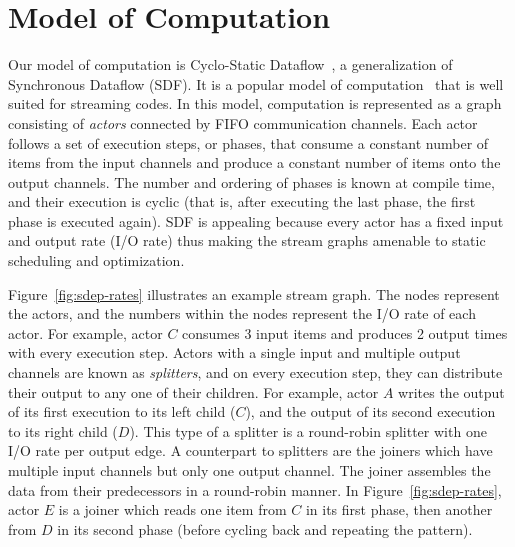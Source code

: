 \newcommand{\la}{$\leftarrow$}
\newcommand{\IND}{\begin{ALC@g}}
\newcommand{\UND}{\end{ALC@g}}
\newcommand{\tup}[2]{\langle{#1}, {#2}\rangle}

\section{Model of Computation}
\label{sec:modelofcomp}


Our model of computation is Cyclo-Static Dataflow~\cite{BELP96},
a generalization of Synchronous Dataflow (SDF). It  is a popular  model of
computation~\cite{LM87-i} that  is well suited for  streaming
codes. In this model, computation is represented  as a graph consisting of
{\it  actors} connected by FIFO communication channels.
Each actor follows a set of execution steps, or phases, that consume
a constant number of items from the input channels and produce a
constant number of items onto the output channels.  
The number and ordering of phases is known at
compile time, and their execution is cyclic (that is, after executing
the last phase, the first phase is executed again).
SDF is appealing because every actor has a fixed input and output rate
(I/O rate) thus making the stream graphs  amenable to static
scheduling and optimization.

Figure~\ref{fig:sdep-rates} illustrates an example stream graph. The
nodes represent the actors, and the numbers within the nodes represent
the I/O rate of each actor. For example, actor $C$  consumes 3 input
items and produces 2 output times with every execution step. Actors
with a single input and multiple output channels are known as {\it splitters}, and on
every execution step, they can distribute their output to any one of
their children. For example, actor $A$ writes the output of its first
execution to its left child ($C$), and the output of its second
execution to its right child ($D$). This type of a splitter is a
round-robin splitter with one I/O rate per output edge. 
A counterpart to splitters
are the joiners which have multiple input channels but only one output
channel. The joiner assembles the data from their predecessors
in a round-robin manner. In Figure~\ref{fig:sdep-rates}, actor $E$ is
a joiner which reads one item from $C$ in its first phase, then
another from $D$ in its second phase (before cycling back and 
repeating the pattern).

